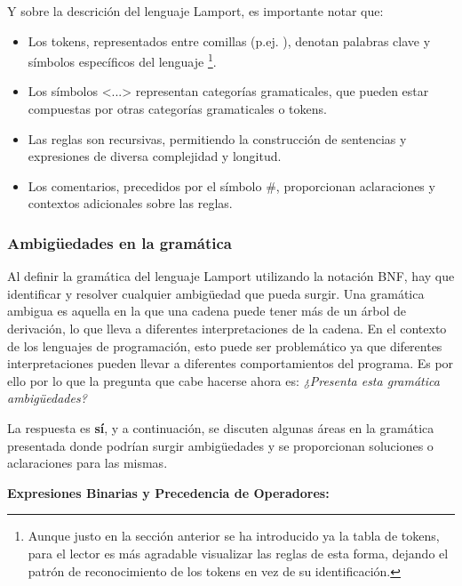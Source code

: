 \noindent
Y sobre la descrición del lenguaje Lamport, es importante notar que:
\begin{itemize}
    \item Los tokens, representados entre comillas (p.ej. ), denotan palabras clave y símbolos específicos del lenguaje \footnote{Aunque justo en la sección anterior se ha introducido ya la tabla de tokens, para el lector es más agradable visualizar las reglas de esta forma, dejando el patrón de reconocimiento de los tokens en vez de su identificación.}.
    \item Los símbolos <...> \hspace{0.05cm} representan categorías gramaticales, que pueden estar compuestas por otras categorías gramaticales o tokens.
    \item Las reglas son recursivas, permitiendo la construcción de sentencias y expresiones de diversa complejidad y longitud.
    \item Los comentarios, precedidos por el símbolo \#, proporcionan aclaraciones y contextos adicionales sobre las reglas.
\end{itemize}

\subsubsection{Ambigüedades en la gramática}\label{subsubsec:gramaticaAmbiguaLamport}
Al definir la gramática del lenguaje Lamport utilizando la notación BNF, hay que identificar y resolver cualquier ambigüedad que pueda surgir. Una gramática ambigua es aquella en la que una cadena puede tener más de un árbol de derivación, lo que lleva a diferentes interpretaciones de la cadena. En el contexto de los lenguajes de programación, esto puede ser problemático ya que diferentes interpretaciones pueden llevar a diferentes comportamientos del programa. Es por ello por lo que la pregunta que cabe hacerse ahora es: \textit{¿Presenta esta gramática ambigüedades?}

\vspace{0.5cm}

La respuesta es \textbf{sí}, y a continuación, se discuten algunas áreas en la gramática presentada donde podrían surgir ambigüedades y se proporcionan soluciones o aclaraciones para las mismas.

\newpage

\noindent
\textbf{Expresiones Binarias y Precedencia de Operadores:}

\vspace{0.3cm}

